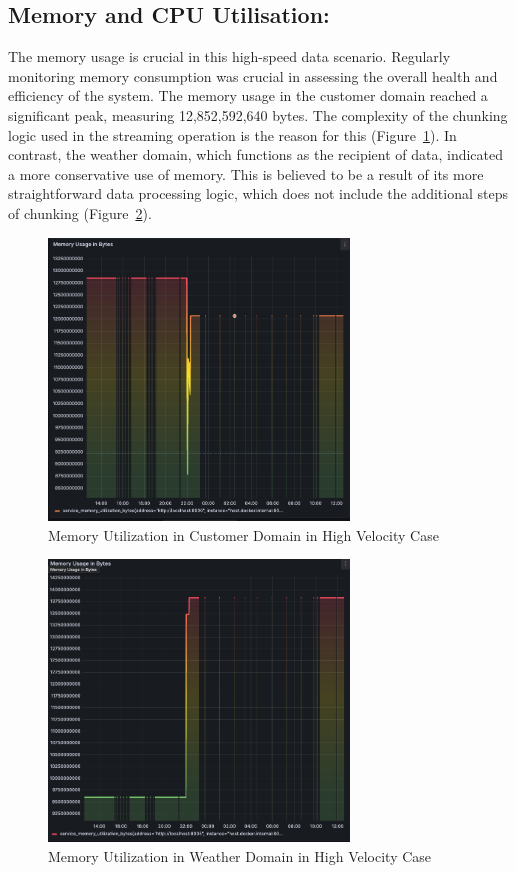 \documentclass[journal]{IEEEtran}
\begin{document}
\subsection{Memory and CPU Utilisation:} The memory usage is crucial in this high-speed data scenario. Regularly monitoring memory consumption was crucial in assessing the overall health and efficiency of the system. The memory usage in the customer domain reached a significant peak, measuring 12,852,592,640 bytes. The complexity of the chunking logic used in the streaming operation is the reason for this (Figure~\ref{memoryUtilizationInCustomerDomainInHighVelocityCase}). In contrast, the weather domain, which functions as the recipient of data, indicated a more conservative use of memory. This is believed to be a result of its more straightforward data processing logic, which does not include the additional steps of chunking (Figure~\ref{memoryUtilizationInWeatherDomainInHighVelocityCase}).

\begin{figure}[h]
  \centering
  \includegraphics[width=8cm]{images/memory-utilization-in-customer-domain-in-streaming-case.png}
  \caption{Memory Utilization in Customer Domain in High Velocity Case}
  \label{memoryUtilizationInCustomerDomainInHighVelocityCase}
\end{figure}

\begin{figure}[h]
  \centering
  \includegraphics[width=8cm]{images/memory-utilization-in-weather-domain-in-streaming-case.png}
  \caption{Memory Utilization in Weather Domain in High Velocity Case}
  \label{memoryUtilizationInWeatherDomainInHighVelocityCase}
\end{figure}
\end{document}
